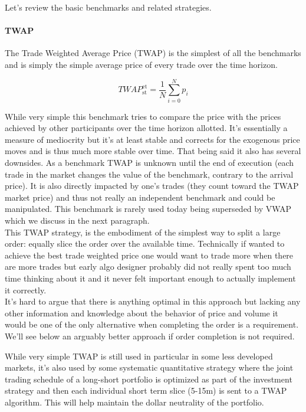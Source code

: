 Let's review the basic benchmarks and related strategies.

\paragraph{TWAP}
The Trade Weighted Average Price (TWAP) is the simplest of all the benchmarks and is simply the simple average price of every trade over the time horizon. 

\begin{equation}
	\mathit{TWAP}_{\text{st}} ^{\text{et}}= \frac{1}{N}\sum_{i=0}^N{p_i}
\end{equation}

While very simple this benchmark tries to compare the price with the prices achieved by other participants over the time horizon allotted. It's essentially a measure of mediocrity but it's at least stable and corrects for the exogenous price moves and is thus much more stable over time. That being said it also has several downsides. As a benchmark TWAP is unknown until the end of execution (each trade in the market changes the value of the benchmark, contrary to the arrival price). It is also directly impacted by one's trades (they count toward the TWAP market price) and thus not really an independent benchmark and could be manipulated. This benchmark is rarely used today being superseded by VWAP which we discuss in the next paragraph.\\

This TWAP strategy, is the embodiment of the simplest way to split a large order: equally slice the order over the available time. Technically if wanted to achieve the best trade weighted price one would want to trade more when there are more trades but early algo designer probably did not really spent too much time thinking about it and it never felt important enough to actually implement it correctly.\\

It's hard to argue that there is anything optimal in this approach but lacking any other information and knowledge about the behavior of price and volume it would be one of the only alternative when completing the order is a requirement. We'll see below an arguably better approach if order completion is not required. 

While very simple TWAP is still used in particular in some less developed markets, it's also used by some systematic quantitative strategy where the joint trading schedule of a long-short portfolio is optimized as part of the investment strategy and then each individual short term slice (5-15m) is sent to a TWAP algorithm. This will help maintain the dollar neutrality of the portfolio.

